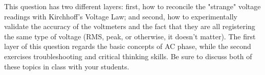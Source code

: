 





This question has two different layers: first, how to reconcile the "strange" voltage readings with Kirchhoff's Voltage Law; and second, how to experimentally validate the accuracy of the voltmeters and the fact that they are all registering the same type of voltage (RMS, peak, or otherwise, it doesn't matter).  The first layer of this question regards the basic concepts of AC phase, while the second exercises troubleshooting and critical thinking skills.  Be sure to discuss both of these topics in class with your students.




